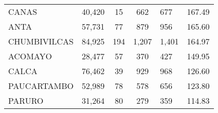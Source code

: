 \begin{tabular}{lrcclr}
	\cellcolor[HTML]{FFFF99}CANAS                                  & 40,420                                                         & 15                                                         & 662                  & 677                                                                 & 167.49                                                                       \\
	\cellcolor[HTML]{FFFF99}ANTA                                   & 57,731                                                         & 77                                                         & 879                  & 956                                                                 & 165.60                                                                       \\
	\cellcolor[HTML]{C6E0B4}CHUMBIVILCAS                           & 84,925                                                         & 194                                                        & 1,207                & 1,401                                                               & 164.97                                                                       \\
	\cellcolor[HTML]{C6E0B4}ACOMAYO                                & 28,477                                                         & 57                                                         & 370                  & 427                                                                 & 149.95                                                                       \\
	\cellcolor[HTML]{C6E0B4}CALCA                                  & 76,462                                                         & 39                                                         & 929                  & 968                                                                 & 126.60                                                                       \\
	\cellcolor[HTML]{C6E0B4}PAUCARTAMBO                            & 52,989                                                         & 78                                                         & 578                  & 656                                                                 & 123.80                                                                       \\
	\cellcolor[HTML]{C6E0B4}PARURO                                 & 31,264                                                         & 80                                                         & 279                  & 359                                                                 & 114.83                                                                       \\

\end{tabular}

